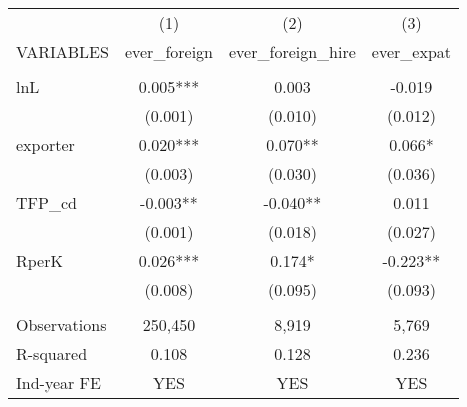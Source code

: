 \begin{tabular}{lccc} \hline
 & (1) & (2) & (3) \\
VARIABLES & ever\_foreign & ever\_foreign\_hire & ever\_expat \\ \hline
 &  &  &  \\
lnL & 0.005*** & 0.003 & -0.019 \\
 & (0.001) & (0.010) & (0.012) \\
exporter & 0.020*** & 0.070** & 0.066* \\
 & (0.003) & (0.030) & (0.036) \\
TFP\_cd & -0.003** & -0.040** & 0.011 \\
 & (0.001) & (0.018) & (0.027) \\
RperK & 0.026*** & 0.174* & -0.223** \\
 & (0.008) & (0.095) & (0.093) \\
 &  &  &  \\
Observations & 250,450 & 8,919 & 5,769 \\
R-squared & 0.108 & 0.128 & 0.236 \\
 Ind-year FE & YES & YES & YES \\ \hline
\end{tabular}
